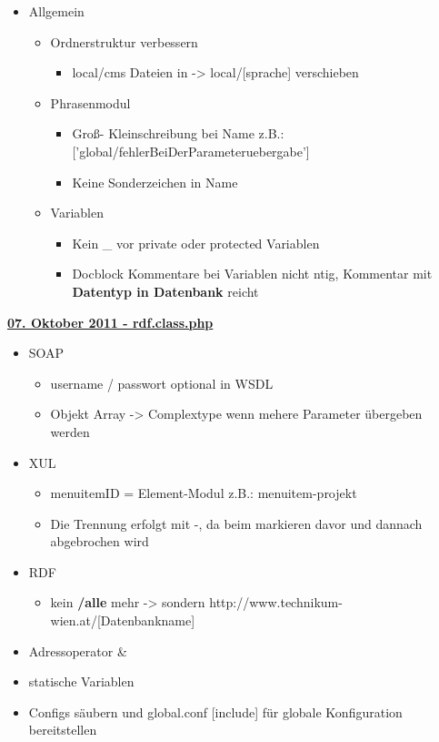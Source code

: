 \begin{itemize}
	\item Allgemein
		\begin{itemize}
		\item Ordnerstruktur verbessern		
			\begin{itemize}
			\item local/cms Dateien in -> local/[sprache] verschieben
			\end{itemize}
		\item Phrasenmodul	
			\begin{itemize}
			\item Gro\ss - Kleinschreibung bei Name z.B.: ['global/fehlerBeiDerParameteruebergabe']
			\item Keine Sonderzeichen in Name
			\end{itemize}
		\item Variablen	
			\begin{itemize}
			\item Kein \_ vor private oder protected Variablen
			\item Docblock Kommentare bei Variablen nicht ntig, Kommentar mit {\bf Datentyp in Datenbank} reicht
			\end{itemize}
		\end{itemize}
\end{itemize}
\newpage

\underline{{\bf 07. Oktober 2011 - rdf.class.php}}
\begin{itemize}
	\item SOAP
		\begin{itemize}
		\item username / passwort optional in WSDL
		\item Objekt Array -> Complextype wenn mehere Parameter \"ubergeben werden 
		\end{itemize}
	\item XUL
		\begin{itemize}
		\item menuitemID = Element-Modul z.B.: menuitem-projekt
		\item Die Trennung erfolgt mit -, da beim markieren davor und dannach abgebrochen wird
		\end{itemize}
	\item RDF
		\begin{itemize}
		\item kein {\bf /alle} mehr -> sondern http://www.technikum-wien.at/[Datenbankname]
		\end{itemize}
	\item Adressoperator \&
	\item statische Variablen
	\item Configs s\"aubern und global.conf [include] f\"ur globale Konfiguration bereitstellen \newline
\end{itemize}

